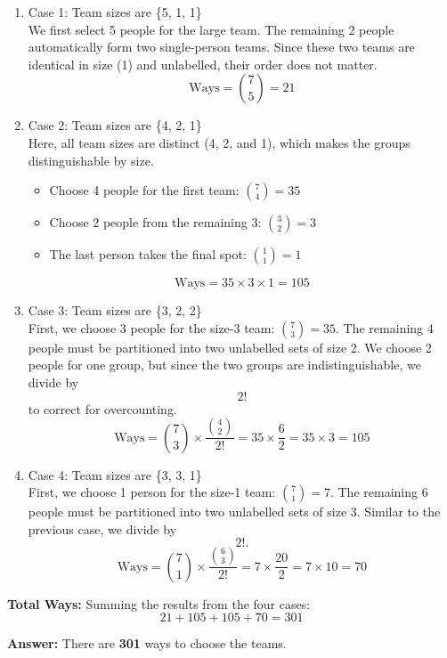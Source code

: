 \documentclass[twoside]{article}
\begin{document}
\begin{enumerate}
    \item Case 1: Team sizes are \{5, 1, 1\} \\
    We first select 5 people for the large team. The remaining 2 people automatically form two single-person teams. Since these two teams are identical in size (1) and unlabelled, their order does not matter. \[ \text{Ways} = \binom{7}{5} = 21 \]
    \item Case 2: Team sizes are \{4, 2, 1\} \\
    Here, all team sizes are distinct (4, 2, and 1), which makes the groups distinguishable by size.
    \begin{itemize}
        \item Choose 4 people for the first team: $\binom{7}{4} = 35$
        \item Choose 2 people from the remaining 3: $\binom{3}{2} = 3$
        \item The last person takes the final spot: $\binom{1}{1} = 1$
    \end{itemize}
    \[ \text{Ways} = 35 \times 3 \times 1 = 105 \]

    \item Case 3: Team sizes are \{3, 2, 2\} \\
    First, we choose 3 people for the size-3 team: $\binom{7}{3} = 35$.
    The remaining 4 people must be partitioned into two unlabelled sets of size 2. We choose 2 people for one group, but since the two groups are indistinguishable, we divide by \[2!\] to correct for overcounting.
    \[ \text{Ways} = \binom{7}{3} \times \frac{\binom{4}{2}}{2!} = 35 \times \frac{6}{2} = 35 \times 3 = 105 \]

    \item Case 4: Team sizes are \{3, 3, 1\} \\
    First, we choose 1 person for the size-1 team: $\binom{7}{1} = 7$.
    The remaining 6 people must be partitioned into two unlabelled sets of size 3. Similar to the previous case, we divide by \[2!.\]
    \[ \text{Ways} = \binom{7}{1} \times \frac{\binom{6}{3}}{2!} = 7 \times \frac{20}{2} = 7 \times 10 = 70 \]
\end{enumerate}

\textbf{Total Ways:}
Summing the results from the four cases:
\[ 21 + 105 + 105 + 70 = 301 \]

\textbf{Answer:} There are \textbf{301} ways to choose the teams.
\end{document}
